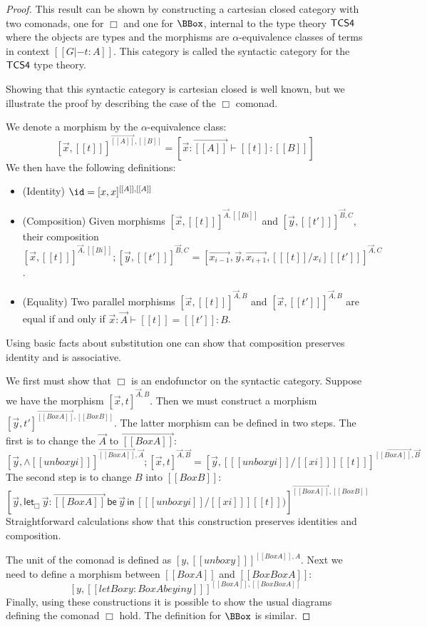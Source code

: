 \begin{proof}
  This result can be shown by constructing a cartesian closed category
  with two comonads, one for $\Box$ and one for $\BBox$, internal to the type theory
  $\sf{TCS4}$ where the objects are types and the morphisms are
  $\alpha$-equivalence classes of terms in context $[[G |- t : A]]$.
  This category is called the syntactic category for the $\sf{TCS4}$
  type theory.

  Showing that this syntactic category is cartesian closed is well
  known, but we illustrate the proof by describing the case of the
  $\Box$ comonad.

  We denote a morphism by the $\alpha$-equivalence class:
  \[
  [\vec{x},[[t]] ]^{\vec{[[A]]},[[B]]} = [ \vec{x}:\vec{[[A]]} \vdash [[t]] : [[B]] ]
  \]
  We then have the following definitions:
  \begin{itemize}
  \item (Identity) $\id = [x,x]^{[[A]],[[A]]}$
  \item (Composition) Given morphisms $[\vec{x},[[t]] ]^{\vec{A},[[Bi]]}$ and
    $[\vec{y},[[t']] ]^{\vec{B},C}$, their composition
    $[\vec{x},[[t]] ]^{\vec{A},[[Bi]]};[\vec{y},[[t']] ]^{\vec{B},C} =
    [\vec{x_{i-1}},\vec{y},\vec{x_{i+1}},[ [[t]] / x_i ] [[t']] ]^{\vec{A},C}$.
  \item (Equality) Two parallel morphisms $[\vec{x},[[t]] ]^{\vec{A},B}$ and $[\vec{x},[[t']] ]^{\vec{A},B}$ are
    equal if and only if
    $\vec{x} : \vec{A} \vdash [[t]] = [[t']] : B$.
  \end{itemize}
  Using basic facts about substitution one can show that composition
  preserves identity and is associative.

  We first must show that $\Box$ is an endofunctor on the syntactic
  category.  Suppose we have the morphism
  $[\vec{x},t]^{\vec{A},B}$.  Then we must construct a morphism
  $[\vec{y},t']^{\overrightarrow{[[Box A]]},[[Box B]]}$.  The latter morphism can be defined in two steps.
  The first is to change the $\vec{A}$ to $\overrightarrow{[[Box A]]}$:
  \[
    [ \vec{y},\wedge [[unbox yi]] ]^{\overrightarrow{[[Box A]]},\vec{A}};[\vec{x},t]^{\vec{A},\vec{B}}
    = [\vec{y}, [ [[unbox yi]]/[[xi]] ] [[t]] ]^{\overrightarrow{[[Box A]]},\vec{B}}
    \]
    The second step is to change $B$ into $[[Box B]]$:
    \[
      [\vec{y},\mathsf{let}_\Box\,\vec{y}:\overrightarrow{[[Box A]]}\,\mathsf{be}\,\vec{y}\,\mathsf{in}\,[ [[unbox yi]]/[[xi]] ][[t]])]^{\overrightarrow{[[Box A]]},[[Box B]]}
      \]
  Straightforward calculations  show that
  this construction preserves identities and composition.

  The unit of the comonad is defined as $[ y,[[unbox y]] ]^{[[Box
        A]],A}$.  Next we need to define a morphism between $[[Box
      A]]$ and $[[Box Box A]]$:
  \[
  [y,[[letBox y : Box A be y in y]] ]^{[[Box A]],[[Box Box A]]}
  \]
  Finally, using these constructions it is possible to show the usual
  diagrams defining the comonad $\Box$ hold.  The definition for
  $\BBox$ is similar.
\end{proof}
